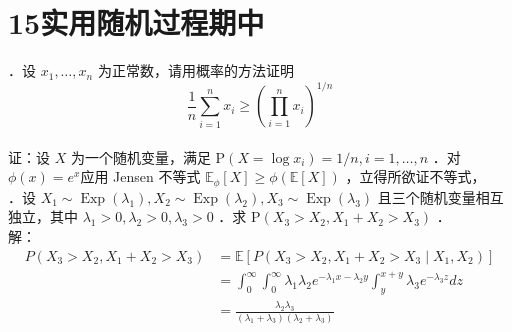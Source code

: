 \documentclass[UTF8,openany]{book}
\begin{document}
\section{\centering 15实用随机过程期中}
．设 $x_{1}, \ldots, x_{n}$ 为正常数，请用概率的方法证明
$$
\frac{1}{n} \sum_{i=1}^{n} x_{i} \geq\left(\prod_{i=1}^{n} x_{i}\right)^{1 / n}
$$\\
证：设 $X$ 为一个随机变量，满足 $\mathrm{P}\left(X=\log x_{i}\right)=1 / n, i=1, \ldots, n$ ．对 $\phi(x)=e^x$应用 Jensen 不等式 $\mathbb{E}_{\phi}[X] \geq \phi(\mathbb{E} [X])$ ，立得所欲证不等式，\\



．设 $X_{1} \sim \operatorname{Exp}\left(\lambda_{1}\right), X_{2} \sim \operatorname{Exp}\left(\lambda_{2}\right), X_{3} \sim \operatorname{Exp}\left(\lambda_{3}\right)$ 且三个随机变量相互独立，其中 $\lambda_{1}>0, \lambda_{2}>0, \lambda_{3}>0$ ．求 $\mathrm{P}\left(X_{3}>X_{2}, X_{1}+X_{2}>X_{3}\right)$ ．\\
解：
$$
\begin{aligned}
	P\left(X_{3}>X_{2}, X_{1}+X_{2}>X_{3}\right) & =\mathbb{E}\left[P\left(X_{3}>X_{2}, X_{1}+X_{2}>X_{3} \mid X_{1}, X_{2}\right)\right] \\
	& =\int_{0}^{\infty} \int_{0}^{\infty} \lambda_{1} \lambda_{2} e^{-\lambda_{1} x-\lambda_{2} y} \int_{y}^{x+y} \lambda_{3} e^{-\lambda_{3} z} d z \\
	& =\frac{\lambda_{2} \lambda_{3}}{\left(\lambda_{1}+\lambda_{3}\right)\left(\lambda_{2}+\lambda_{3}\right)}
\end{aligned}
$$\\
\end{document}
